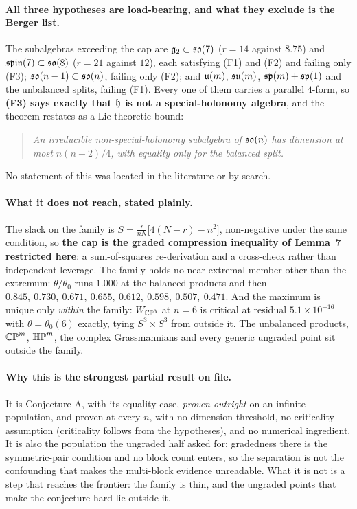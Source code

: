 \paragraph{All three hypotheses are load-bearing, and what they exclude is the Berger list.} The subalgebras exceeding the cap are $\mathfrak g_2\subset\mathfrak{so}(7)$ ($r=14$ against $8.75$) and $\mathfrak{spin}(7)\subset\mathfrak{so}(8)$ ($r=21$ against $12$), each satisfying (F1) and (F2) and failing only (F3); $\mathfrak{so}(n-1)\subset\mathfrak{so}(n)$, failing only (F2); and $\mathfrak{u}(m)$, $\mathfrak{su}(m)$, $\mathfrak{sp}(m)+\mathfrak{sp}(1)$ and the unbalanced splits, failing (F1). Every one of them carries a parallel $4$-form, so \textbf{(F3) says exactly that $\mathfrak{h}$ is not a special-holonomy algebra}, and the theorem restates as a Lie-theoretic bound:

\begin{quote}
\emph{An irreducible non-special-holonomy subalgebra of $\mathfrak{so}(n)$ has dimension at most $n(n-2)/4$, with equality only for the balanced split.}
\end{quote}

No statement of this was located in the literature or by search.

\paragraph{What it does not reach, stated plainly.} The slack on the family is $S=\tfrac{r}{nN}\big[4(N-r)-n^2\big]$, non-negative under the same condition, so \textbf{the cap is the graded compression inequality of Lemma~7 restricted here}: a sum-of-squares re-derivation and a cross-check rather than independent leverage. The family holds no near-extremal member other than the extremum: $\theta/\theta_0$ runs $1.000$ at the balanced products and then $0.845,\ 0.730,\ 0.671,\ 0.655,\ 0.612,\ 0.598,\ 0.507,\ 0.471$. And the maximum is unique only \emph{within} the family: $W_{\mathbb{CP}^3}$ at $n=6$ is critical at residual $5.1\times10^{-16}$ with $\theta=\theta_0(6)$ exactly, tying $S^3\times S^3$ from outside it. The unbalanced products, $\mathbb{CP}^m$, $\mathbb{HP}^m$, the complex Grassmannians and every generic ungraded point sit outside the family.

\paragraph{Why this is the strongest partial result on file.} It is Conjecture A, with its equality case, \emph{proven outright} on an infinite population, and proven at every $n$, with no dimension threshold, no criticality assumption (criticality follows from the hypotheses), and no numerical ingredient. It is also the population the ungraded half asked for: gradedness there is the symmetric-pair condition and no block count enters, so the separation is not the confounding that makes the multi-block evidence unreadable. What it is not is a step that reaches the frontier: the family is thin, and the ungraded points that make the conjecture hard lie outside it.


